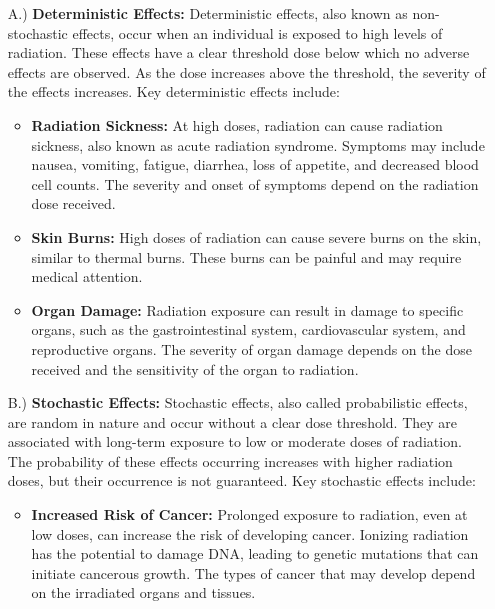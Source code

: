 \documentclass[../../Report.tex]{subfiles}
\begin{document}
        \begin{enumerate}
            \item[A.)] \textbf{Deterministic Effects:} Deterministic effects, also known as non-stochastic effects, occur when an 
            individual is exposed to high levels of radiation. These effects have a clear threshold dose below which no adverse effects are observed. 
            As the dose increases above the threshold, the severity of the effects increases. Key deterministic effects include:

            \begin{itemize}
                \item \textbf{Radiation Sickness:} At high doses, radiation can cause radiation sickness, also known as acute radiation syndrome. 
                Symptoms may include nausea, vomiting, fatigue, diarrhea, loss of appetite, and decreased blood cell counts. 
                The severity and onset of symptoms depend on the radiation dose received.

                \item \textbf{Skin Burns:} High doses of radiation can cause severe burns on the skin, similar to thermal burns. 
                These burns can be painful and may require medical attention.

                \item \textbf{Organ Damage:} Radiation exposure can result in damage to specific organs, such as the gastrointestinal system, 
                cardiovascular system, and reproductive organs. The severity of organ damage depends on the dose received and the sensitivity of 
                the organ to radiation.

            \end{itemize} 

            \item[B.)] \textbf{Stochastic Effects:}
            Stochastic effects, also called probabilistic effects, are random in nature and occur without a clear dose threshold. 
            They are associated with long-term exposure to low or moderate doses of radiation. The probability of these effects occurring 
            increases with higher radiation doses, but their occurrence is not guaranteed. Key stochastic effects include:

            \begin{itemize}
                \item \textbf{Increased Risk of Cancer:} Prolonged exposure to radiation, even at low doses, can increase the risk of 
                developing cancer. Ionizing radiation has the potential to damage DNA, leading to genetic mutations that can 
                initiate cancerous growth. The types of cancer that may develop depend on the irradiated organs and tissues.


\end{itemize}
\end{enumerate}
\end{document}
